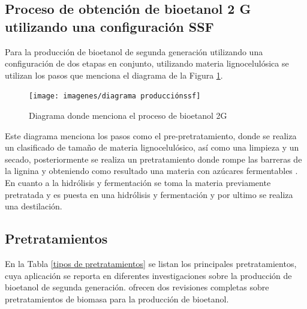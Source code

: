 \documentclass[12pt]{article}
\begin{document}
		\subsection{Proceso de obtención de bioetanol 2 G  utilizando una configuración SSF  }		
		Para la producción de bioetanol de segunda generación utilizando una configuración de dos etapas en conjunto, utilizando materia lignocelulósica se utilizan los pasos que menciona el diagrama de la Figura \ref{fig:diagrama-produccionssf}.
	
		\begin{figure}[H]
			\centering
			\texttt{[image: imagenes/diagrama producciónssf]}
			\caption{Diagrama donde menciona el proceso de bioetanol 2G}
			\label{fig:diagrama-produccionssf}
		\end{figure}
		
		
	Este diagrama menciona los pasos como el pre-pretratamiento, donde se realiza un clasificado de tamaño de materia lignocelulósico, así como una limpieza y un secado, posteriormente se realiza un pretratamiento donde rompe las barreras de la lignina y obteniendo como resultado una materia con azúcares fermentables . En cuanto a la hidrólisis y fermentación se toma la materia previamente pretratada y es puesta en una hidrólisis y fermentación y por ultimo se realiza una destilación.
		
		
		
		\subsection{Pretratamientos}
		En la Tabla \ref{tipos de pretratamientos} se listan los principales pretratamientos, cuya aplicación se reporta en diferentes investigaciones sobre la producción de bioetanol de segunda generación.%
		ofrecen dos revisiones completas sobre pretratamientos de biomasa para la producción de bioetanol.
		
\end{document}
